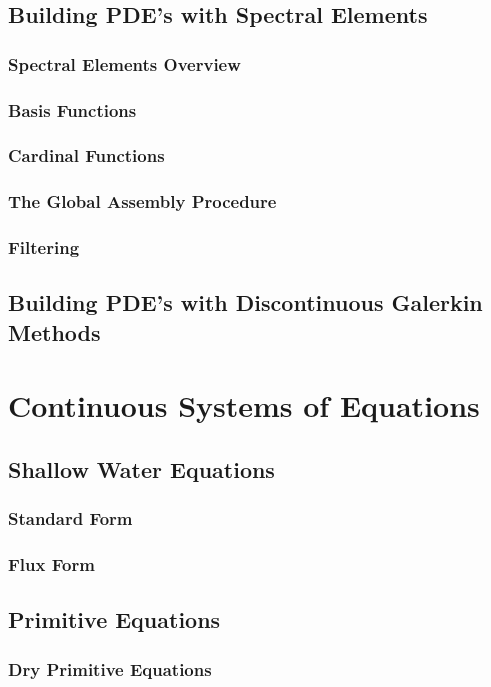 \documentclass[12pt]{article}
\numberwithin{equation}{section}
\begin{document}
\subsection{Building PDE's with Spectral Elements}
\subsubsection{Spectral Elements Overview}
\subsubsection{Basis Functions}
\subsubsection{Cardinal Functions}
\subsubsection{The Global Assembly Procedure}
\subsubsection{Filtering}

\subsection{Building PDE's with Discontinuous Galerkin Methods}

\section{Continuous Systems of Equations}

\subsection{Shallow Water Equations}
\subsubsection{Standard Form}
\subsubsection{Flux Form}

\subsection{Primitive Equations}
\subsubsection{Dry Primitive Equations}
\end{document}
